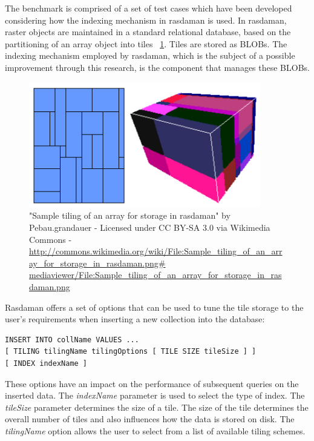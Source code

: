 \documentclass[11pt, a4paper, oneside]{article}
\begin{document}
The benchmark is comprised of a set of test cases which have been developed considering how the indexing mechanism in rasdaman is used. In rasdaman, raster objects are maintained in a standard relational database, based on the partitioning of an array object into tiles\cite{DBLP:conf/icde/FurtadoB99} ~\ref{fig:rasdaman-tile}. Tiles are stored as BLOBs. The indexing mechanism employed by rasdaman, which is the subject of a possible improvement through this research, is the component that manages these BLOBs.

\begin{figure}[h!]
  \centering
    \includegraphics[width=0.9\textwidth]{img/tiling}
    \caption{"Sample tiling of an array for storage in rasdaman" by Pebau.grandauer - Licensed under CC BY-SA 3.0 via Wikimedia Commons -\url{http://commons.wikimedia.org/wiki/File:Sample_tiling_of_an_array_for_storage_in_rasdaman.png\# mediaviewer/File:Sample_tiling_of_an_array_for_storage_in_rasdaman.png }}
  \label{fig:rasdaman-tile}
\end{figure}

Rasdaman offers a set of options that can be used to tune the tile storage to the user's requirements when inserting a new collection into the database:

\begin{verbatim}
INSERT INTO collName VALUES ...
[ TILING tilingName tilingOptions [ TILE SIZE tileSize ] ]
[ INDEX indexName ]
\end{verbatim}

These options have an impact on the performance of subsequent queries on the inserted data. The \textit{indexName} parameter is used to select the type of index. The \textit{tileSize} parameter determines the size of a tile. The size of the tile determines the overall number of tiles and also influences how the data is stored on disk. The \textit{tilingName} option allows the user to select from a list of available tiling schemes. 
\end{document}
